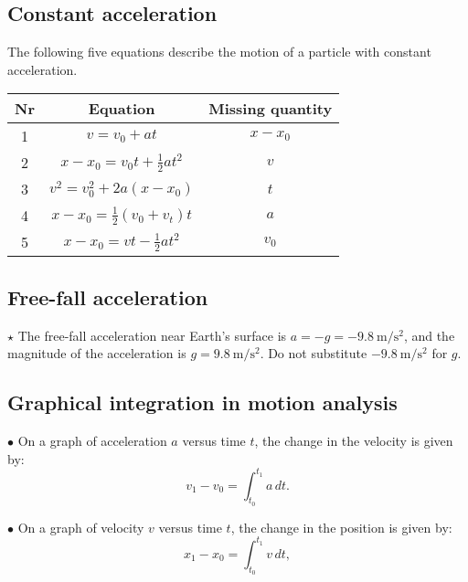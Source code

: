 \documentclass[fleqn]{article}
\begin{document}
\subsection{Constant acceleration}
The following five equations describe the motion of a particle with constant acceleration.
\begin{table*}[h]
    \centering
    \begin{tabular}{|c|c|c|}
    \hline
    Nr & Equation & Missing quantity \\ \hline
    1 & $v = v_0 + at$ & $x - x_0$  \\ \hline
    2 & $x - x_0 = v_0 t + \frac{1}{2} at^2$ & $v$ \\ \hline
    3 & $v^2 = v^2_0 + 2a(x-x_0)$ & $t$ \\ \hline
    4 & $x-x_0 = \frac{1}{2}(v_0+v_t)t$ & $a$ \\ \hline
    5 & $x-x_0 = vt-\frac{1}{2}at^2$ & $v_0$ \\ \hline
    \end{tabular}    
\end{table*}

\subsection{Free-fall acceleration}
\noindent $\star$ The free-fall acceleration near Earth’s surface is $a = -g = -9.8~\mathrm{m/s^2}$, and the magnitude of the acceleration is $g = 9.8~\mathrm{m/s^2}$. Do not substitute $-9.8~\mathrm{m/s^2}$ for $g$.

\newpage

\subsection{Graphical integration in motion analysis}
\begin{multicols}{2}

\noindent $\bullet$ On a graph of acceleration $a$ versus time $t$, the change in the velocity is given by:
\[
v_1 - v_0 = \int_{t_0}^{t_1} a\, dt.
\]

\columnbreak

\noindent $\bullet$ On a graph of velocity $v$ versus time $t$, the change in the position is given by:
\[
x_1 - x_0 = \int_{t_0}^{t_1} v\, dt,
\]
\end{multicols}
\end{document}
